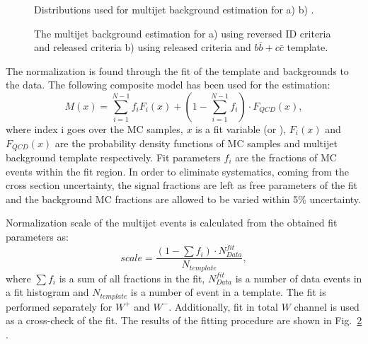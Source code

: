 \begin{figure}[!tbp]
\begin{minipage}[h]{0.49\linewidth}
\end{minipage}
\hfill
\begin{minipage}[h]{0.49\linewidth}
\end{minipage}
\caption{Distributions used for multijet background estimation for a) \wenu b) \wmunu.}
\label{ris:FitDistributions}
\end{figure}

\begin{figure}[!tbp]
\begin{minipage}[h]{0.49\linewidth}
\end{minipage}
\hfill
\begin{minipage}[h]{0.49\linewidth}
\end{minipage}
\caption{The multijet background estimation for a) \wenu using reversed ID criteria and released \etmiss criteria b) \wmunu using released \mtw criteria and $b\bar{b}+c\bar{c}$ template.}
\label{ris:Fit}
\end{figure}

The normalization is found through the \chiD fit of the template and backgrounds to the data. The following composite model has been used for the estimation:
\begin{equation}
M(x) = \sum_{i=1}^{N-1}f_iF_i(x) + (1- \sum_{i=1}^{N-1} f_i)\cdot F_{QCD}(x),
\end{equation}
where index i goes over the MC samples, $x$ is a fit variable (\etmiss or \mtw), $F_i(x)$ and $ F_{QCD}(x)$ are the probability density functions of MC samples and multijet background template respectively. Fit parameters $f_i$ are the fractions of MC events within the fit region. In order to eliminate systematics, coming from the cross section uncertainty, the signal fractions are left as free parameters of the fit and the background MC fractions are allowed to be varied within 5\% uncertainty. 

Normalization scale of the multijet events is calculated from the obtained fit parameters as:
\begin{equation}
scale = \frac{(1-\sum f_i) \cdot N^{fit}_{Data}}{N_{template}},
\end{equation}
where $\sum f_i$ is a sum of all fractions in the fit, $N^{fit}_{Data}$ is a number of data events in a fit histogram and $N_{template}$ is a number of event in a template. The fit is performed separately for $W^{+}$ and $W^{-}$. Additionally, fit in total $W$ channel is used as a cross-check of the fit.
The results of the fitting procedure are shown in Fig.~\ref{ris:Fit} . 
 



